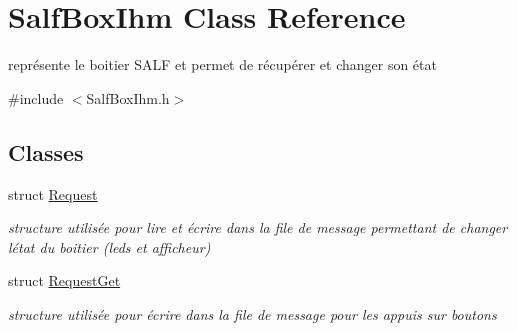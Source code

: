 \hypertarget{class_salf_box_ihm}{}\section{Salf\+Box\+Ihm Class Reference}
\label{class_salf_box_ihm}


représente le boitier S\+A\+LF et permet de récupérer et changer son état  




{\ttfamily \#include $<$Salf\+Box\+Ihm.\+h$>$}

\subsection*{Classes}
\begin{DoxyCompactItemize}
\item 
struct \hyperlink{struct_salf_box_ihm_1_1_request}{Request}
\begin{DoxyCompactList}\small\item\em structure utilisée pour lire et écrire dans la file de message permettant de changer l\textquotesingle{}état du boitier (leds et afficheur) \end{DoxyCompactList}\item 
struct \hyperlink{struct_salf_box_ihm_1_1_request_get}{Request\+Get}
\begin{DoxyCompactList}\small\item\em structure utilisée pour écrire dans la file de message pour les appuis sur boutons \end{DoxyCompactList}\end{DoxyCompactItemize}
